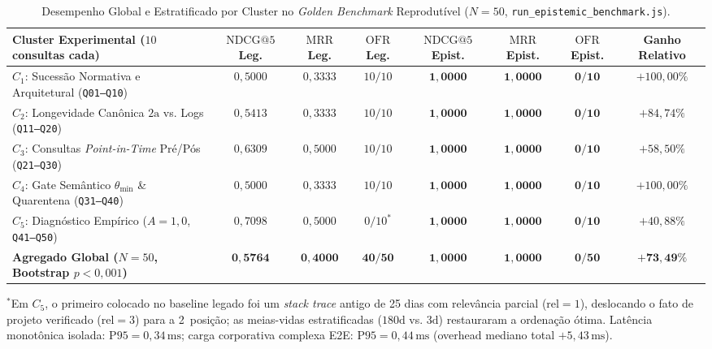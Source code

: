 \documentclass[10pt,twocolumn]{article}
\begin{document}
\begin{table}[t]
\centering
\caption{Desempenho Global e Estratificado por Cluster no \emph{Golden Benchmark} Reprodut\'ivel ($N = 50$, \texttt{run\_epistemic\_benchmark.js}).}
\label{tab:resultados}
\footnotesize
\begin{tabularx}{\textwidth}{@{}X c c c c c c c@{}}
\toprule
\textbf{Cluster Experimental ($10$ consultas cada)} & \textbf{$\mathrm{NDCG@5}$ Leg.} & \textbf{$\mathrm{MRR}$ Leg.} & \textbf{$\mathrm{OFR}$ Leg.} & \textbf{$\mathrm{NDCG@5}$ Epist.} & \textbf{$\mathrm{MRR}$ Epist.} & \textbf{$\mathrm{OFR}$ Epist.} & \textbf{Ganho Relativo} \\
\midrule
$C_1$: Sucess\~ao Normativa e Arquitetural (\texttt{Q01--Q10}) & $0{,}5000$ & $0{,}3333$ & $10/10$ & $\mathbf{1{,}0000}$ & $\mathbf{1{,}0000}$ & $\mathbf{0/10}$ & $+100{,}00\%$ \\
$C_2$: Longevidade Can\^onica $2\text{a}$ vs. Logs (\texttt{Q11--Q20}) & $0{,}5413$ & $0{,}3333$ & $10/10$ & $\mathbf{1{,}0000}$ & $\mathbf{1{,}0000}$ & $\mathbf{0/10}$ & $+84{,}74\%$ \\
$C_3$: Consultas \emph{Point-in-Time} Pr\'e/P\'os (\texttt{Q21--Q30}) & $0{,}6309$ & $0{,}5000$ & $10/10$ & $\mathbf{1{,}0000}$ & $\mathbf{1{,}0000}$ & $\mathbf{0/10}$ & $+58{,}50\%$ \\
$C_4$: Gate Sem\^antico $\theta_{\min}$ \& Quarentena (\texttt{Q31--Q40}) & $0{,}5000$ & $0{,}3333$ & $10/10$ & $\mathbf{1{,}0000}$ & $\mathbf{1{,}0000}$ & $\mathbf{0/10}$ & $+100{,}00\%$ \\
$C_5$: Diagn\'ostico Emp\'irico ($A=1{,}0$, \texttt{Q41--Q50}) & $0{,}7098$ & $0{,}5000$ & $0/10^*$ & $\mathbf{1{,}0000}$ & $\mathbf{1{,}0000}$ & $\mathbf{0/10}$ & $+40{,}88\%$ \\
\midrule
\textbf{Agregado Global ($N = 50$, Bootstrap $p < 0{,}001$)} & $\mathbf{0{,}5764}$ & $\mathbf{0{,}4000}$ & $\mathbf{40/50}$ & $\mathbf{1{,}0000}$ & $\mathbf{1{,}0000}$ & $\mathbf{0/50}$ & $\mathbf{+73{,}49\%}$ \\
\bottomrule
\end{tabularx}
\vspace{0.25em}
\par\raggedright\scriptsize $^*$Em $C_5$, o primeiro colocado no baseline legado foi um \emph{stack trace} antigo de 25 dias com relev\^ancia parcial ($\mathrm{rel}=1$), deslocando o fato de projeto verificado ($\mathrm{rel}=3$) para a 2\textordfeminine~posi\c{c}\~ao; as meias-vidas estratificadas ($180\text{d}$ vs. $3\text{d}$) restauraram a ordena\c{c}\~ao \'otima. Lat\^encia monot\^onica isolada: $\mathrm{P95} = 0{,}34\,\mathrm{ms}$; carga corporativa complexa E2E: $\mathrm{P95} = 0{,}44\,\mathrm{ms}$ (overhead mediano total $+5{,}43\,\mathrm{ms}$).
\end{table}
\end{document}
